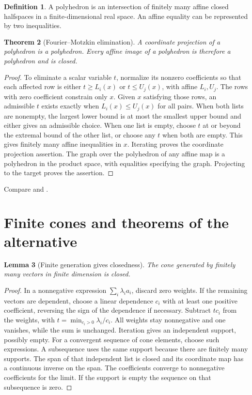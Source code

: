 \documentclass[11pt,oneside,openany]{book}
\theoremstyle{plain}
\newtheorem{theorem}{Theorem}[chapter]
\newtheorem{lemma}[theorem]{Lemma}
\theoremstyle{definition}
\newtheorem{definition}[theorem]{Definition}
\theoremstyle{remark}
\begin{document}
\begin{definition}
A polyhedron is an intersection of finitely many affine closed
halfspaces in a finite-dimensional real space. An affine
equality can be represented by two inequalities.
\end{definition}

\begin{theorem}[Fourier--Motzkin elimination]\label{thm:poly-image}
A coordinate projection of a polyhedron is a polyhedron.
Every affine image of a polyhedron is therefore a polyhedron
and is closed.
\end{theorem}

\begin{proof}
To eliminate a scalar variable \(t\), normalize its nonzero
coefficients so that each affected row is either
\(t\ge L_i(x)\) or \(t\le U_j(x)\), with affine \(L_i,U_j\).
The rows with zero coefficient constrain only \(x\).
Given \(x\) satisfying those rows, an admissible \(t\) exists
exactly when \(L_i(x)\le U_j(x)\) for all pairs. When both
lists are nonempty, the largest lower bound is at most the
smallest upper bound and either gives an admissible choice.
When one list is empty, choose \(t\) at or beyond the extremal
bound of the other list, or choose any \(t\) when both are
empty. This gives finitely many affine inequalities in \(x\).
Iterating proves the coordinate projection assertion.
The graph over the polyhedron of any affine map is a
polyhedron in the product space, with equalities specifying
the graph. Projecting to the target proves the assertion.
\end{proof}

Compare \cite[\S\S19--20 and 22]{Rockafellar} and
\cite[\S13.2]{NocedalWright}.

\section{Finite cones and theorems of the alternative}\label{v01-09}

\begin{lemma}[Finite generation gives closedness]
\label{lem:finitely-generated-closed}
The cone generated by finitely many vectors in finite dimension is closed.
\end{lemma}

\begin{proof}
In a nonnegative expression \(\sum_i \lambda_i a_i\), discard zero
weights. If the remaining vectors are dependent, choose a linear
dependence \(c_i\) with at least one positive coefficient, reversing
the sign of the dependence if necessary. Subtract \(t c_i\) from
the weights, with \(t=\min_{c_i>0}\lambda_i/c_i\).
All weights stay nonnegative and one vanishes, while the sum is
unchanged. Iteration gives an independent support, possibly empty.
For a convergent sequence of cone elements, choose such expressions.
A subsequence uses the same support because there are finitely many
supports. The span of that independent list is closed and its
coordinate map has a continuous inverse on the span.
The coefficients converge to nonnegative coefficients for the
limit. If the support is empty the sequence on that subsequence is zero.
\end{proof}
\end{document}

